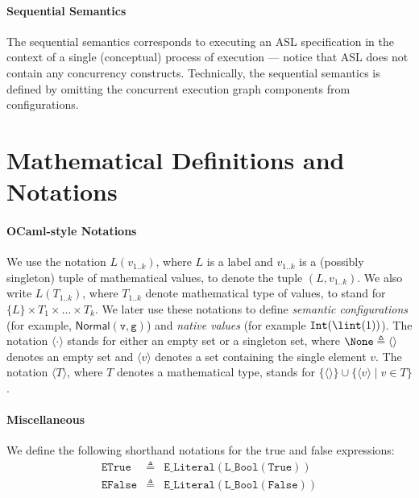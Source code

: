 \documentclass{book}
\newcommand\nvint[0]{\texttt{Int}}
\newcommand\Normal[0]{\textsf{Normal}}
\newcommand\vg[0]{\texttt{g}}
\newcommand\vv[0]{\texttt{v}}
\begin{document}
\paragraph{Sequential Semantics}
The sequential semantics corresponds to executing an ASL specification in the context of a single (conceptual) process
of execution --- notice that ASL does not contain any concurrency constructs.
%
Technically, the sequential semantics is defined by omitting the concurrent execution graph components
from configurations.

\section{Mathematical Definitions and Notations}



\paragraph{OCaml-style Notations}
We use the notation $L(v_{1..k})$, where $L$ is a label and $v_{1..k}$ is a (possibly singleton) tuple of mathematical values,
to denote the tuple $(L,v_{1..k})$.
We also write $L(T_{1..k})$, where $T_{1..k}$ denote mathematical type of values, to stand for
$\{L\} \times T_1 \times \ldots \times T_k$.
%
We later use these notations to define \emph{semantic configurations} (for example, $\Normal(\vv, \vg)$)
and \emph{native values} (for example $\nvint(\lint(1))$).
%
The notation $\langle \cdot \rangle$ stands for either an empty set or a singleton set,
where $\None\triangleq\langle\rangle$ denotes an empty set
and $\langle v \rangle$ denotes a set containing the single element $v$.
%
The notation $\langle T \rangle$, where $T$ denotes a mathematical type, stands for
$\{ \langle\rangle \} \cup \{\langle v \rangle \;|\; v \in T\}$.

\paragraph{Miscellaneous}
We define the following shorthand notations for the true and false expressions:
\newcommand\etrue[0]{\texttt{ETrue}}
\newcommand\efalse[0]{\texttt{EFalse}}
\[
\begin{array}{rcl}
  \etrue &\triangleq& \texttt{E\_Literal}(\texttt{L\_Bool}(\texttt{True}))\\
  \efalse &\triangleq& \texttt{E\_Literal}(\texttt{L\_Bool}(\texttt{False}))\\
\end{array}
\]
\end{document}
